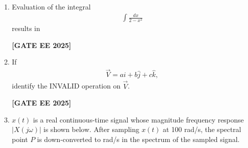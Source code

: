 \documentclass[journal]{IEEEtran}
\newcommand{\qfooter}{%
  \begin{flushright}\footnotesize\textbf{[GATE EE 2025]}\end{flushright}\vspace{1em}%
}
\begin{document}
\begin{enumerate}
\begin{enumerate}
\end{enumerate}
\qfooter

\item Evaluation of the integral
\begin{align}
\int \frac{dx}{2 - x^2}
\end{align}
results in

\begin{enumerate}
\end{enumerate}
\qfooter

\item If 
\begin{align}
\vec{V} = a \hat{i} + b \hat{j} + c \hat{k},
\end{align}
identify the INVALID operation on \(\vec{V}\).

\begin{enumerate}
\end{enumerate}
\qfooter

\item \(x(t)\) is a real continuous-time signal whose magnitude frequency response \(|X(j \omega)|\) is shown below. After sampling \(x(t)\) at 100 rad/s, the spectral point \(P\) is down-converted to\underline{\hspace{2cm}} rad/s in the spectrum of the sampled signal.


\end{enumerate}
\end{document}

